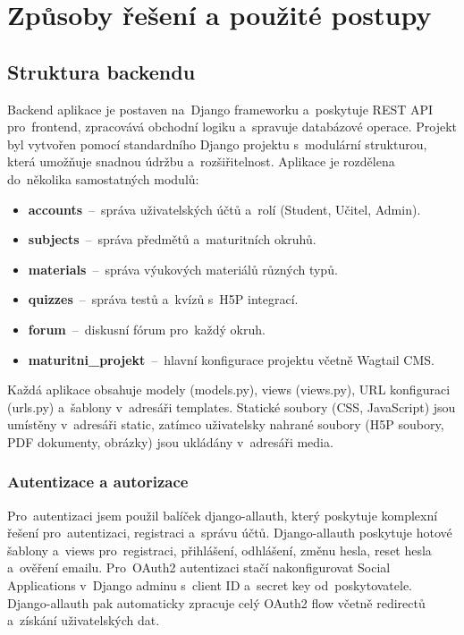 \documentclass[12pt, a4paper,
twoside,
openany
]{report}
\begin{document}
	\chapter{Způsoby řešení a použité postupy}

	\section{Struktura backendu}
	
	Backend aplikace je postaven na~Django frameworku a~poskytuje REST API pro~frontend, zpracovává obchodní logiku a~spravuje databázové operace. Projekt byl vytvořen pomocí standardního Django projektu s~modulární strukturou, která umožňuje snadnou údržbu a~rozšiřitelnost. Aplikace je rozdělena do~několika samostatných modulů:
	
	\begin{itemize}
		\item \textbf{accounts}~--~správa uživatelských účtů a~rolí (Student, Učitel, Admin).
		\item \textbf{subjects}~--~správa předmětů a~maturitních okruhů.
		\item \textbf{materials}~--~správa výukových materiálů různých typů.
		\item \textbf{quizzes}~--~správa testů a~kvízů s~H5P integrací.
		\item \textbf{forum}~--~diskusní fórum pro~každý okruh.
		\item \textbf{maturitni\_projekt}~--~hlavní konfigurace projektu včetně Wagtail CMS.
	\end{itemize}
	
	Každá aplikace obsahuje modely (models.py), views (views.py), URL konfiguraci (urls.py) a~šablony v~adresáři templates. Statické soubory (CSS, JavaScript) jsou umístěny v~adresáři static, zatímco uživatelsky nahrané soubory (H5P soubory, PDF dokumenty, obrázky) jsou ukládány v~adresáři media.

	\subsection{Autentizace a autorizace}
	
	Pro~autentizaci jsem použil balíček django-allauth, který poskytuje komplexní řešení pro~autentizaci, registraci a~správu účtů. Django-allauth poskytuje hotové šablony a~views pro~registraci, přihlášení, odhlášení, změnu hesla, reset hesla a~ověření emailu. Pro~OAuth2 autentizaci stačí nakonfigurovat Social Applications v~Django adminu s~client ID a~secret key od~poskytovatele. Django-allauth pak automaticky zpracuje celý OAuth2 flow včetně redirectů a~získání uživatelských dat.
	
\end{document}
